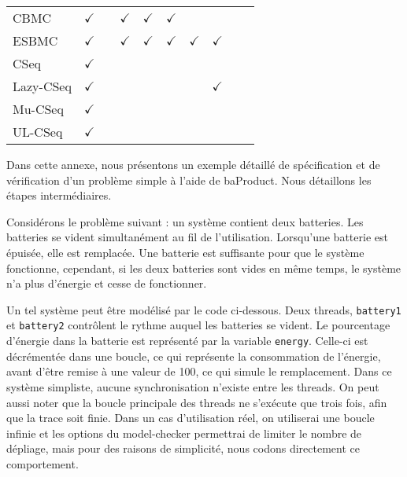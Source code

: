 \begin{landscape}
\begin{table}[ht]
\begin{tabular}{|l|c|c|c|c|c|c|c|c|c|}
CBMC       & $\checkmark$ &              & $\checkmark$ & $\checkmark$ & $\checkmark$ &              &              &              &                \\
ESBMC      & $\checkmark$ &              & $\checkmark$ & $\checkmark$ & $\checkmark$ & $\checkmark$ & $\checkmark$ &              &                \\
CSeq       & $\checkmark$ &              &              &              &              &              &              &              &                \\
Lazy-CSeq  & $\checkmark$ &              &              &              &              &              & $\checkmark$ &              &                \\
Mu-CSeq    & $\checkmark$ &              &              &              &              &              &              &              &                \\
UL-CSeq    & $\checkmark$ &              &              &              &              &              &              &              &                \\ \hline
\end{tabular}
\label{tab:prop_type_table}
\end{table}

\end{landscape}




Dans cette annexe, nous présentons un exemple détaillé de spécification et de
vérification d'un problème simple à l'aide de baProduct. Nous détaillons les
étapes intermédiaires.

Considérons le problème suivant : un système contient deux batteries. Les
batteries se vident simultanément au fil de l'utilisation. Lorsqu'une batterie
est épuisée, elle est remplacée. Une batterie est suffisante pour que le système
fonctionne, cependant, si les deux batteries sont vides en même temps, le
système n'a plus d'énergie et cesse de fonctionner.

Un tel système peut être modélisé par le code ci-dessous. Deux threads,
\texttt{battery1} et \texttt{battery2} contrôlent le rythme auquel les
batteries se vident. Le pourcentage d'énergie dans la batterie est représenté
par la variable \texttt{energy}. Celle-ci est décrémentée dans une
boucle, ce qui représente la consommation de l'énergie, avant d'être remise à
une valeur de 100, ce qui simule le remplacement. Dans ce système simpliste,
aucune synchronisation n'existe entre les threads.
On peut aussi noter que la boucle principale des threads ne s'exécute que trois
fois, afin que la trace soit finie. Dans un cas d'utilisation réel, on
utiliserai une boucle infinie et les options du model-checker permettrai de
limiter le nombre de dépliage, mais pour des raisons de simplicité, nous codons
directement ce comportement.

